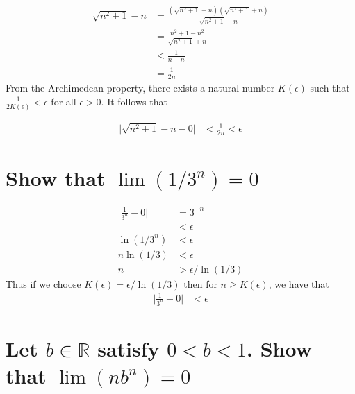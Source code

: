 \documentclass{article}
\begin{document}
\begin{align*}
    \sqrt{n^2 + 1} - n & = \frac{(\sqrt{n^2 + 1} - n)(\sqrt{n^2 + 1} + n)}{\sqrt{n^2 + 1} + n} \\
                       & = \frac{n^2 + 1 - n^2}{\sqrt{n^2 + 1} + n} \\
                       & < \frac{1}{n + n} \\
                       & = \frac{1}{2n}
\end{align*}
From the Archimedean property, there exists a natural number $K(\epsilon)$ such that  $\frac{1}{2K(\epsilon)} < \epsilon$ for all $\epsilon > 0$.
It follows that 

\begin{align*}
    \Big| \sqrt{n^2 + 1} - n - 0 \Big| & < \frac{1}{2n} < \epsilon
\end{align*}

\section{Show that $\lim(1/3^n) = 0$}
\begin{align*}
    \Big| \frac{1}{3^n} - 0 \Big| & = 3^{-n} \\
                                  & < \epsilon \\
                       \ln(1/3^n) & < \epsilon \\
                       n\ln(1/3)  & < \epsilon \\
                               n  & > \epsilon/\ln(1/3)
\end{align*}
Thus if we choose $K(\epsilon) = \epsilon/\ln(1/3)$ then for $n \ge K(\epsilon)$, we have that 
\begin{align*}    
    \Big| \frac{1}{3^n} - 0 \Big| & < \epsilon 
\end{align*}

\section{Let $b \in \mathbb{R}$ satisfy $0 < b < 1$. Show that $\lim(nb^n) = 0$}
\end{document}
